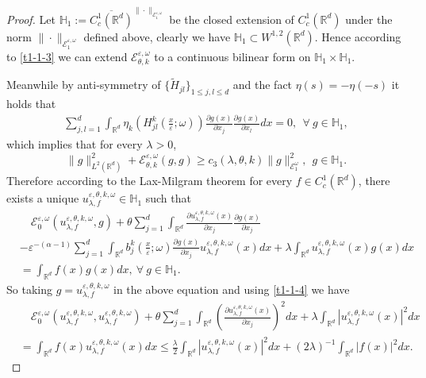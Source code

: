 \documentclass[11pt,draft, reqno]{amsart}
\renewcommand{\le}{\leqslant}
\renewcommand{\ge}{\geqslant}
\def\EE{{\mathcal E}}
\newcommand{\R}{\mathds R}
\newcommand{\e}{\varepsilon}
\newcommand{\w}{\omega}
\theoremstyle{definition}
\numberwithin{equation}{section}
\begin{document}
\begin{proof}
Let $\mathbb{H}_1:=\overline{C_c^1(\R^d)}^{\|\cdot\|_{\EE^{\e,\w}_1}}$ be the closed extension of
$C_c^1(\R^d)$ under the norm $\|\cdot\|_{\EE^{\e,\w}_1}$ defined above, clearly we have
$\mathbb{H}_1\subset W^{1,2}(\R^d)$. Hence according to \eqref{t1-1-3} we can extend
$\EE^{\e,\w}_{\theta,k}$ to a continuous bilinear form on $\mathbb{H}_1\times \mathbb{H}_1$.

Meanwhile by anti-symmetry of $\{\tilde H_{jl}\}_{1\le j,l\le d}$ and the fact $\eta(s)=-\eta(-s)$ it holds that
\begin{align}\label{t1-1-4}
\sum_{j,l=1}^d\int_{\R^d}\eta_k\left(H_{jl}^k\left(\frac{x}{\e};\w\right)\right)\frac{\partial g(x)}{\partial x_j}\frac{\partial g(x)}{\partial x_l}dx=0,
\ \ \forall\ g\in \mathbb{H}_1,
\end{align}
which implies that for every $\lambda>0$,
\begin{equation*}
\|g\|_{L^2(\R^d)}^2+\EE_{\theta,k}^{\e,\w}(g,g)\ge c_3(\lambda,\theta,k)\|g\|_{\EE^\w_1}^2,\ \ g\in \mathbb{H}_1.
\end{equation*}
Therefore according to the Lax-Milgram theorem for every $f\in C_c^1(\R^d)$, there exists a unique $u_{\lambda,f}^{\e,\theta,k,\w}\in \mathbb{H}_1$ such that
\begin{equation}\label{t1-1-4a}
\begin{split}
&\quad \EE^{\e,\w}_0(u_{\lambda,f}^{\e,\theta,k,\w},g)+\theta\sum_{j=1}^d\int_{\R^d}\frac{\partial u_{\lambda,f}^{\e,\theta,k,\w}(x)}{\partial x_j}
\frac{\partial g(x)}{\partial x_j}\\
&-\e^{-(\alpha-1)}\sum_{j=1}^d \int_{\R^d}b_{j}^k\left(\frac{x}{\e};\w\right)\frac{\partial g(x)}{\partial x_j}
u_{\lambda,f}^{\e,\theta,k,\w}(x)dx
+\lambda\int_{\R^d}u_{\lambda,f}^{\e,\theta,k,\w}(x)g(x)dx\\
&=\int_{\R^d}f(x)g(x)dx,\ \forall\ g\in \mathbb{H}_1.
\end{split}
\end{equation}
So taking $g=u_{\lambda,f}^{\e,\theta,k,\w}$ in the above equation and using \eqref{t1-1-4} we have
\begin{align*}
&\quad \EE^{\e,\w}_0(u_{\lambda,f}^{\e,\theta,k,\w},u_{\lambda,f}^{\e,\theta,k,\w})+\theta\sum_{j=1}^d\int_{\R^d}
\left(\frac{\partial u_{\lambda,f}^{\e,\theta,k,\w}(x)}{\partial x_j}\right)^2dx+\lambda\int_{\R^d}|u_{\lambda,f}^{\e,\theta,k,\w}(x)|^2dx\\
&=\int_{\R^d}f(x)u_{\lambda,f}^{\e,\theta,k,\w}(x)dx
\le \frac{\lambda}{2}\int_{\R^d}|u_{\lambda,f}^{\e,\theta,k,\w}(x)|^2dx+(2\lambda)^{-1}\int_{\R^d}|f(x)|^2dx.

\end{align*}
\end{proof}
\end{document}
